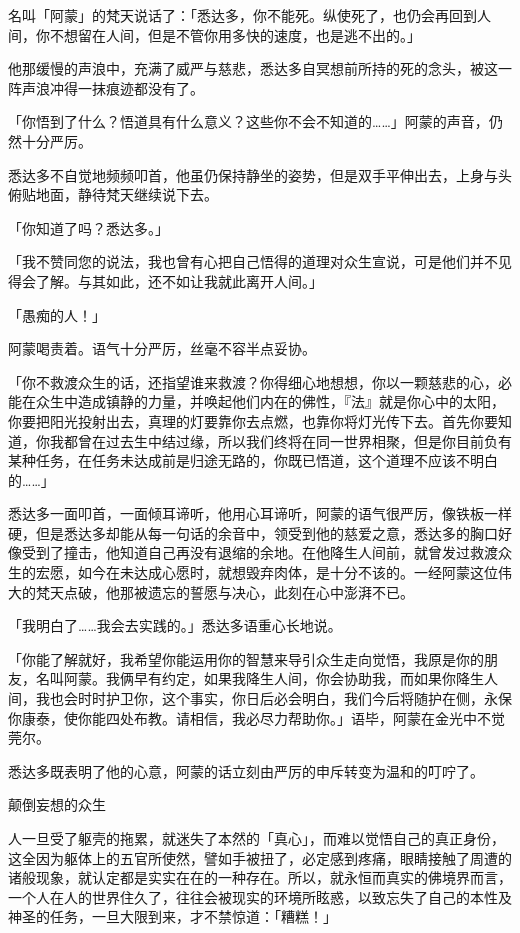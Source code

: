 \documentclass[12pt,twoside,openany]{book}
\begin{document}
名叫「阿蒙」的梵天说话了：「悉达多，你不能死。纵使死了，也仍会再回到人间，你不想留在人间，但是不管你用多快的速度，也是逃不出的。」

他那缓慢的声浪中，充满了威严与慈悲，悉达多自冥想前所持的死的念头，被这一阵声浪冲得一抹痕迹都没有了。

「你悟到了什么？悟道具有什么意义？这些你不会不知道的……」阿蒙的声音，仍然十分严厉。

悉达多不自觉地频频叩首，他虽仍保持静坐的姿势，但是双手平伸出去，上身与头俯贴地面，静待梵天继续说下去。

「你知道了吗？悉达多。」

「我不赞同您的说法，我也曾有心把自己悟得的道理对众生宣说，可是他们并不见得会了解。与其如此，还不如让我就此离开人间。」

「愚痴的人！」

阿蒙喝责着。语气十分严厉，丝毫不容半点妥协。

「你不救渡众生的话，还指望谁来救渡？你得细心地想想，你以一颗慈悲的心，必能在众生中造成镇静的力量，并唤起他们内在的佛性，『法』就是你心中的太阳，你要把阳光投射出去，真理的灯要靠你去点燃，也靠你将灯光传下去。首先你要知道，你我都曾在过去生中结过缘，所以我们终将在同一世界相聚，但是你目前负有某种任务，在任务未达成前是归途无路的，你既已悟道，这个道理不应该不明白的……」

悉达多一面叩首，一面倾耳谛听，他用心耳谛听，阿蒙的语气很严厉，像铁板一样硬，但是悉达多却能从每一句话的余音中，领受到他的慈爱之意，悉达多的胸口好像受到了撞击，他知道自己再没有退缩的余地。在他降生人间前，就曾发过救渡众生的宏愿，如今在未达成心愿时，就想毁弃肉体，是十分不该的。一经阿蒙这位伟大的梵天点破，他那被遗忘的誓愿与决心，此刻在心中澎湃不已。

「我明白了……我会去实践的。」悉达多语重心长地说。

「你能了解就好，我希望你能运用你的智慧来导引众生走向觉悟，我原是你的朋友，名叫阿蒙。我俩早有约定，如果我降生人间，你会协助我，而如果你降生人间，我也会时时护卫你，这个事实，你日后必会明白，我们今后将随护在侧，永保你康泰，使你能四处布教。请相信，我必尽力帮助你。」语毕，阿蒙在金光中不觉莞尔。

悉达多既表明了他的心意，阿蒙的话立刻由严厉的申斥转变为温和的叮咛了。

颠倒妄想的众生

人一旦受了躯壳的拖累，就迷失了本然的「真心」，而难以觉悟自己的真正身份，这全因为躯体上的五官所使然，譬如手被扭了，必定感到疼痛，眼睛接触了周遭的诸般现象，就认定都是实实在在的一种存在。所以，就永恒而真实的佛境界而言，一个人在人的世界住久了，往往会被现实的环境所眩惑，以致忘失了自己的本性及神圣的任务，一旦大限到来，才不禁惊道：「糟糕！」
\end{document}
